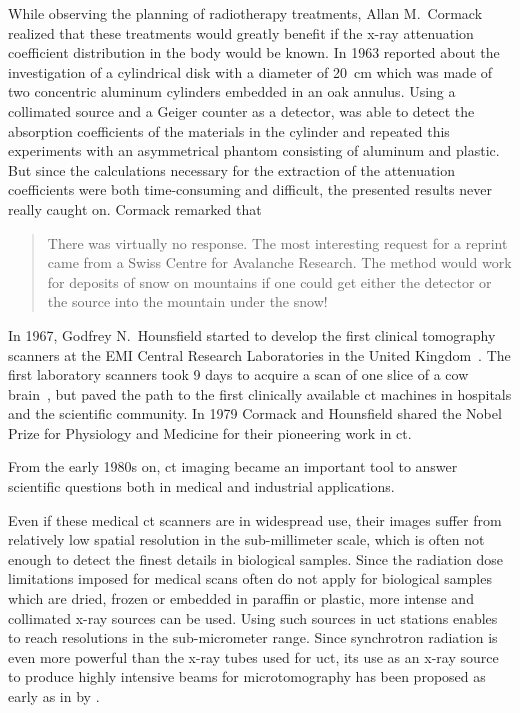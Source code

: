 While observing the planning of radiotherapy treatments, Allan M.\ Cormack realized that these treatments would greatly benefit if the x-ray attenuation coefficient distribution in the body would be known. In 1963 \citet{Cormack1963} reported about the investigation of a cylindrical disk with a diameter of \SI{20}{\centi\meter} which was made of two concentric aluminum cylinders embedded in an oak annulus. Using a collimated  source and a Geiger counter as a detector, \citeauthor{Cormack1963} was able to detect the absorption coefficients of the materials in the cylinder and repeated this experiments with an asymmetrical phantom consisting of aluminum and plastic. But since the calculations necessary for the extraction of the attenuation coefficients were both time-consuming and difficult, the presented results never really caught on. Cormack remarked that \begin{quote} There was virtually no response. The most interesting request for a reprint came from a Swiss Centre for Avalanche Research. The method would work for deposits of snow on mountains if one could get either the detector or the source into the mountain under the snow! \cite{Cormack1979}\end{quote}

In 1967, Godfrey N.\ Hounsfield started to develop the first clinical tomography scanners at the EMI Central Research Laboratories in the United Kingdom~\cite{Hsieh2003}. The first laboratory scanners took 9 days to acquire a scan of one slice of a cow brain~\cite{Hounsfield1976}, but paved the path to the first clinically available \ac{ct} machines in hospitals and the scientific community. In 1979 Cormack and Hounsfield shared the Nobel Prize for Physiology and Medicine for their pioneering work in \ac{ct}.

From the early 1980s on, \ac{ct} imaging became an important tool to answer scientific questions both in medical and industrial applications.

Even if these medical \ac{ct} scanners are in widespread use, their images suffer from relatively low spatial resolution in the sub-millimeter scale, which is often not enough to detect the finest details in biological samples. Since the radiation dose limitations imposed for medical scans often do not apply for biological samples which are dried, frozen or embedded in paraffin or plastic, more intense and collimated x-ray sources can be used. Using such sources in \ac{uct} stations enables to reach resolutions in the sub-micrometer range. Since synchrotron radiation is even more powerful than the x-ray tubes used for \ac{uct}, its use as an x-ray source to produce highly intensive beams for microtomography has been proposed as early as in \citeyear{Grodzins1983} by \citet{Grodzins1983,Grodzins1983a}.

